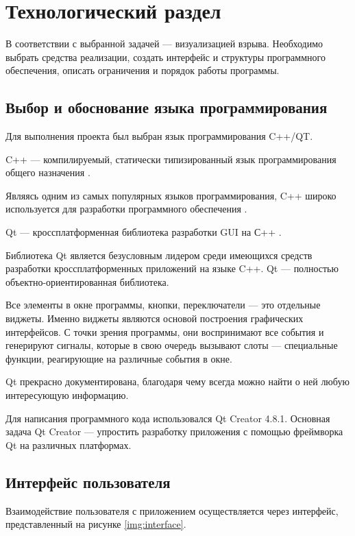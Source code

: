 \chapter{\textbf{Технологический раздел}}

\hfill

В соответствии с выбранной задачей --- визуализацией взрыва. Необходимо выбрать средства реализации, создать интерфейс и структуры программного обеспечения, описать ограничения и порядок работы программы. 

\section{\textbf{Выбор и обоснование языка программирования }}

Для выполнения проекта был выбран язык программирования C++/QT.

C++ --- компилируемый, статически типизированный язык программирования общего назначения \cite{c++}. 

Являясь одним из самых популярных языков программирования, C++ широко используется для разработки программного обеспечения \cite{usingc++}. 

Qt --- кроссплатформенная библиотека разработки GUI на С++ \cite{qt}.

Библиотека Qt является безусловным лидером среди имеющихся средств разработки кроссплатформенных приложений на языке C++. Qt --- полностью объектно-ориентированная библиотека.

Все элементы в окне программы, кнопки, переключатели --- это отдельные виджеты. Именно виджеты являются основой построения графических интерфейсов. С точки зрения программы, они воспринимают все
события и генерируют сигналы, которые в свою очередь вызывают слоты --- специальные функции, реагирующие на различные события в окне. 

Qt прекрасно документирована, благодаря чему всегда можно найти о ней любую интересующую информацию.

Для написания программного кода использовался Qt Creator 4.8.1. Основная задача Qt Creator --- упростить разработку приложения с помощью фреймворка Qt на различных платформах.

\section{\textbf{Интерфейс пользователя }}

Взаимодействие пользователя с приложением осуществляется через интерфейс, представленный на рисунке \ref{img:interface}. 


